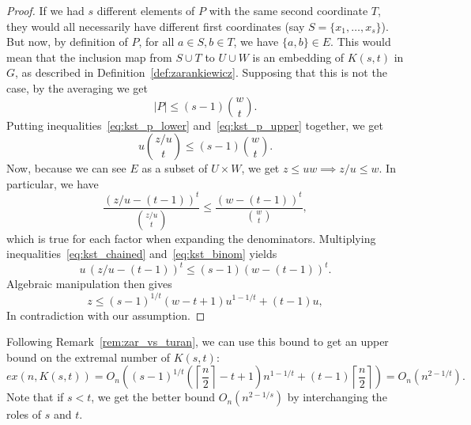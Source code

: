 \begin{theorem}
\begin{proof}
        If we had $s$ different elements of $P$ with the same second coordinate $T$,
        they would all necessarily have different first coordinates
        (say $S = \{x_1, \dots, x_s\}$).
        But now, by definition of $P$, for all $a \in S, b \in T$, we have $\{a, b\} \in E$.
        This would mean that the inclusion map from $ S \cup T$ to $U \cup W$ is an embedding of
        $K(s, t)$ in $G$, as described in Definition~\ref{def:zarankiewicz}.
        Supposing that this is not the case, by the averaging we get
        \begin{equation} \label{eq:kst_p_upper}
            |P| \leq (s - 1) \binom{w}{t}.
        \end{equation}
        Putting inequalities~\eqref{eq:kst_p_lower} and~\eqref{eq:kst_p_upper}
        together, we get
        \begin{equation} \label{eq:kst_chained}
            u \binom{z / u}{t} \leq (s - 1) \binom{w}{t}.
        \end{equation}
        Now, because we can see $E$ as a subset of $U \times W$,
        we get $z \leq uw \implies z/u \leq w$.
        In particular, we have
        \begin{equation} \label{eq:kst_binom}
            \frac{(z/u - (t - 1))^t}{\binom{z/u}{t}} \leq \frac{(w - (t - 1))^t}{\binom{w}{t}},
        \end{equation}
        which is true for each factor when expanding the denominators.
        Multiplying inequalities~\eqref{eq:kst_chained} and~\eqref{eq:kst_binom} yields
        \[
            u \, (z/u - (t - 1))^t \leq (s - 1)(w - (t - 1))^t.
        \]
        Algebraic manipulation then gives
        \[
            z \leq (s - 1)^{1 / t}(w - t + 1)u^{1 - 1 / t} + (t - 1)u,
        \]
        In contradiction with our assumption. \qedhere


    \end{proof}

\end{theorem}

\begin{remark}
    Following Remark~\ref{rem:zar_vs_turan}, we can use this bound to get an upper bound on the extremal number of $K(s, t)$:
    \[
        ex(n, K(s, t)) =
        O_n\left((s - 1)^{1 / t}\left(\left\lceil\frac{n}{2}\right\rceil - t + 1\right)n^{1 - 1 / t} + (t - 1)\left\lceil\frac{n}{2}\right\rceil\right) =
        O_n\left(n^{2 - 1 / t}\right).
    \]
    Note that if $s < t$, we get the better bound $O_n\left(n^{2 - 1 / s}\right)$ by interchanging the roles of $s$ and $t$.
\end{remark}

